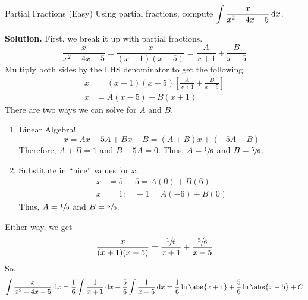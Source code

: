 \begin{Example}{Partial Fractions (Easy)}{}
    Using partial fractions, compute
    $ \displaystyle \int \frac{x}{x^2-4x-5} \odif{x} $.

    \textbf{Solution.}
    First, we break it up with partial fractions.
    \[ \frac{x}{x^2-4x-5} =\frac{x}{(x+1)(x-5)}=\frac{A}{x+1} +\frac{B}{x-5} \]
    Multiply both sides by the LHS denominator to get the following.
    \begin{align*}
        x & =(x+1)(x-5)\left[ \frac{A}{x+1} +\frac{B}{x-5}  \right] \\
        x & =A(x-5)+B(x+1)
    \end{align*}
    There are two ways we can solve for $ A $ and $ B $.
    \begin{enumerate}[label=(\roman*)]
        \item Linear Algebra!
              \[ x=Ax-5A+Bx+B=(A+B)x+(-5A+B) \]
              Therefore, $ A+B = 1 $ and $ B-5A=0 $. Thus, $ A=\sfrac{1}{6} $
              and $ B=\sfrac{5}{6} $.
        \item Substitute in ``nice'' values for $ x $.
              \begin{align*}
                  x & =5\colon \quad 5   =A(0)+B(6)  \\
                  x & =1\colon \quad -1  =A(-6)+B(0)
              \end{align*}
              Thus, $ A=\sfrac{1}{6} $ and $ B=\sfrac{5}{6} $.
    \end{enumerate}
    Either way, we get
    \[ \frac{x}{(x+1)(x-5)}=\frac{\sfrac{1}{6}}{x+1}+\frac{\sfrac{5}{6}}{x-5}  \]
    So,
    \[
        \int \frac{x}{x^2-4x-5}\odif{x}
        =\frac{1}{6} \int \frac{1}{x+1}\odif{x} +\frac{5}{6} \int \frac{1}{x-5} \odif{x}
        =\frac{1}{6} \ln\abs{x+1}+\frac{5}{6} \ln\abs{x-5}+C
    \]
\end{Example}

